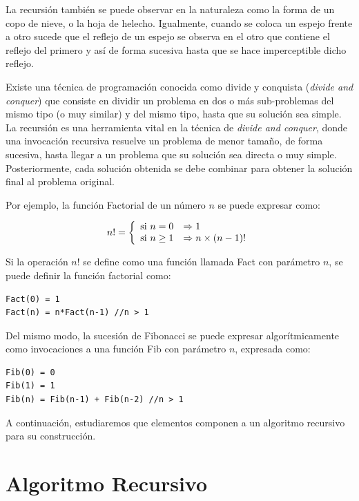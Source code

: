 La recursión también se puede observar en la naturaleza como la forma de un copo de nieve, o la hoja de helecho. Igualmente, cuando se coloca un espejo frente a otro sucede que el reflejo de un espejo se observa en el otro que contiene el reflejo del primero y así de forma sucesiva hasta que se hace imperceptible dicho reflejo.

Existe una técnica de programación conocida como divide y conquista (\textit{divide and conquer}) que consiste en dividir un problema en dos o más sub-problemas del mismo tipo (o muy similar) y del mismo tipo, hasta que su solución sea simple. La recursión es una herramienta vital en la técnica de \textit{divide and conquer}, donde una invocación recursiva resuelve un problema de menor tamaño, de forma sucesiva, hasta llegar a un problema que su solución sea directa o muy simple. Posteriormente, cada solución obtenida se debe combinar para obtener la solución final al problema original.

Por ejemplo, la función Factorial de un número $n$ se puede expresar como:

$$
n! = \left\lbrace
\begin{array}{ll}
\textup{si } n=0 & \Rightarrow 1\\
\textup{si } n\geq 1 & \Rightarrow n \times (n-1)!
\end{array}
\right.
$$

Si la operación $n!$ se define como una función llamada Fact con parámetro $n$, se puede definir la función factorial como:

\begin{lstlisting}[upquote=true, language=pseudo]
Fact(0) = 1
Fact(n) = n*Fact(n-1) //n > 1
\end{lstlisting}

Del mismo modo, la sucesión de Fibonacci se puede expresar algorítmicamente como invocaciones a una función Fib con parámetro $n$, expresada como:

\begin{lstlisting}[upquote=true, language=pseudo]
Fib(0) = 0
Fib(1) = 1
Fib(n) = Fib(n-1) + Fib(n-2) //n > 1
\end{lstlisting}

A continuación, estudiaremos que elementos componen a un algoritmo recursivo para su construcción.

\section{Algoritmo Recursivo}

